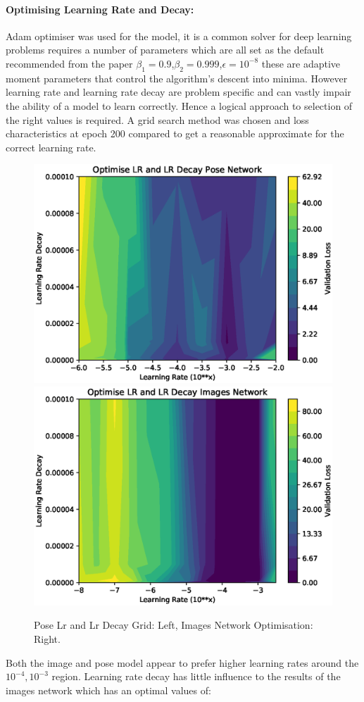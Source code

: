 \documentclass[11pt,twoside]{report}
\begin{document}
\paragraph{Optimising Learning Rate and Decay:}
Adam optimiser was used for the model, it is a common solver for deep learning problems requires a number of parameters which are all set as the default recommended from the paper \cite{DBLP:journals/corr/KingmaB14} $\beta_{1}=0.9$,$\beta_{2}=0.999$,$\epsilon=10^{-8}$ these are adaptive moment parameters that control the algorithm's descent into minima. However learning rate and learning rate decay are problem specific and can vastly impair the ability of a model to learn correctly. Hence a logical approach to selection of the right values is required. A grid search method was chosen and loss characteristics at epoch 200 compared to get a reasonable approximate for the correct learning rate.


\noindent \begin{figure}[h!]
	\includegraphics[width = 0.5\hsize]{figures/pose_lr_lr_decay_graph_.eps}
	\includegraphics[width = 0.5\hsize]{figures/images_lr_lr_decay_graph_.eps}
	\caption{Pose Lr and Lr Decay Grid: Left, Images Network Optimisation: Right.}
	\label{lr_and_decay_grid}
\end{figure}

Both the image and pose model appear to prefer higher learning rates around the $10^{-4},10^{-3}$ region. Learning rate decay has little influence to the results of the images network which has an optimal values of:
\end{document}
